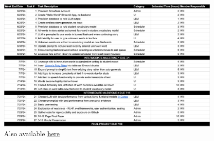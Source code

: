 \documentclass[
	letterpaper, %
]{jdf}
\begin{document}
\begin{figure}
    \centering
    \includegraphics[width=0.9\linewidth]{Project Proposal/project_plan.png}
    \caption{Also available \href{https://docs.google.com/spreadsheets/d/10IeplrSFJeub_BLcY34Mex57YlT-x3DftFnladG2l4g/edit?usp=sharing}{here}}
    \label{Task List}
\end{figure}

\printbibliography{}
\end{document}
